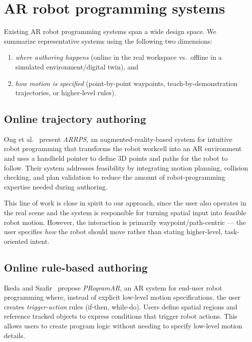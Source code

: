 \section{AR robot programming systems}

Existing AR robot programming systems span a wide design space. We summarize representative systems using the following two dimensions:
\begin{enumerate}[label=(\roman*)]
    \item \emph{where authoring happens} (online in the real workspace vs.\ offline in a simulated environment/digital twin), and
    \item \emph{how motion is specified} (point-by-point waypoints, teach-by-demonstration trajectories, or higher-level rules).
\end{enumerate}

\subsection{Online trajectory authoring} \label{subsec:related_work_online_trajectory_authoring}

Ong et al.~\cite{Ong2020} present \emph{ARRPS}, an augmented-reality-based system for intuitive robot programming that transforms the robot workcell into an AR environment and uses a handheld pointer to define 3D points and paths for the robot to follow. Their system addresses feasibility by integrating motion planning, collision checking, and plan validation to reduce the amount of robot-programming expertise needed during authoring.

This line of work is close in spirit to our approach, since the user also operates in the real scene and the system is responsible for turning spatial input into feasible robot motion. However, the interaction is primarily waypoint/path-centric --- the user specifies \emph{how} the robot should move rather than stating higher-level, task-oriented intent.

\subsection{Online rule-based authoring}

Ikeda and Szafir~\cite{Ikeda2024} propose \emph{PRogramAR}, an AR system for end-user robot programming where, instead of explicit low-level motion specifications, the user creates \emph{trigger-action} rules (if-then, while-do). Users define spatial regions and reference tracked objects to express conditions that trigger robot actions. This allows users to create program logic without needing to specify low-level motion details.

